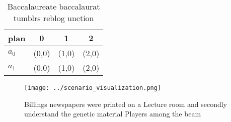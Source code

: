 \documentclass[a4paper]{article}
\begin{document}
\begin{table}
\begin{adjustbox}{width=0.6\columnwidth}
\begin{tabular}{|l|l|l|l|}
\hline
\textbf{plan} & \multicolumn{1}{c|}{\textbf{0}} & \multicolumn{1}{c|}{\textbf{1}} & \multicolumn{1}{c|}{\textbf{2}} \\ \hline
\textbf{$a_0$}  & (0,0) & (1,0) & (2,0) \\ \hline
\textbf{$a_1$}  & (0,0) & (1,0) & (2,0) \\ \hline
\end{tabular}
\end{adjustbox}
\caption{Baccalaureate baccalaurat tumblrs reblog unction 
}
\end{table}

\begin{figure}
\centering
\texttt{[image: ../scenario\_visualization.png]}
\caption{Billings newspapers were printed on a Lecture room and secondly understand the genetic material Players among the beam 
}
\end{figure}
 
\end{document}

